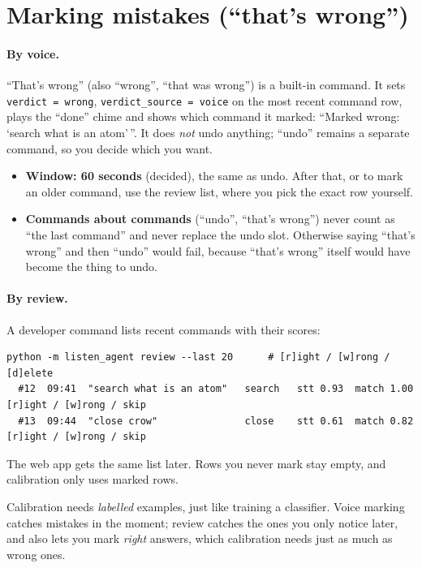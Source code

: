 \documentclass[11pt,a4paper]{article}
\begin{document}
\section{Marking mistakes (``that's wrong'')}\label{sec:verdict}

\paragraph{By voice.} ``That's wrong'' (also ``wrong'', ``that was wrong'') is a built-in
command. It sets \texttt{verdict = wrong}, \texttt{verdict\_source = voice} on the most recent
command row, plays the ``done'' chime and shows which command it marked: ``Marked wrong:
`search what is an atom'\,''. It does \emph{not} undo anything; ``undo'' remains a separate
command, so you decide which you want.

\begin{itemize}[nosep]
  \item \textbf{Window: 60 seconds} (decided), the same as undo. After that, or to mark an older
        command, use the review list, where you pick the exact row yourself.
  \item \textbf{Commands about commands} (``undo'', ``that's wrong'') never count as ``the
        last command'' and never replace the undo slot. Otherwise saying ``that's wrong'' and
        then ``undo'' would fail, because ``that's wrong'' itself would have become the thing to
        undo.
\end{itemize}

\paragraph{By review.} A developer command lists recent commands with their scores:
\begin{lstlisting}
python -m listen_agent review --last 20      # [r]ight / [w]rong / [d]elete
  #12  09:41  "search what is an atom"   search   stt 0.93  match 1.00   [r]ight / [w]rong / skip
  #13  09:44  "close crow"               close    stt 0.61  match 0.82   [r]ight / [w]rong / skip
\end{lstlisting}
\noindent The web app gets the same list later. Rows you never mark stay empty, and
calibration only uses marked rows.

\begin{why}
Calibration needs \emph{labelled} examples, just like training a classifier. Voice marking
catches mistakes in the moment; review catches the ones you only notice later, and also lets
you mark \emph{right} answers, which calibration needs just as much as wrong ones.
\end{why}
\end{document}
